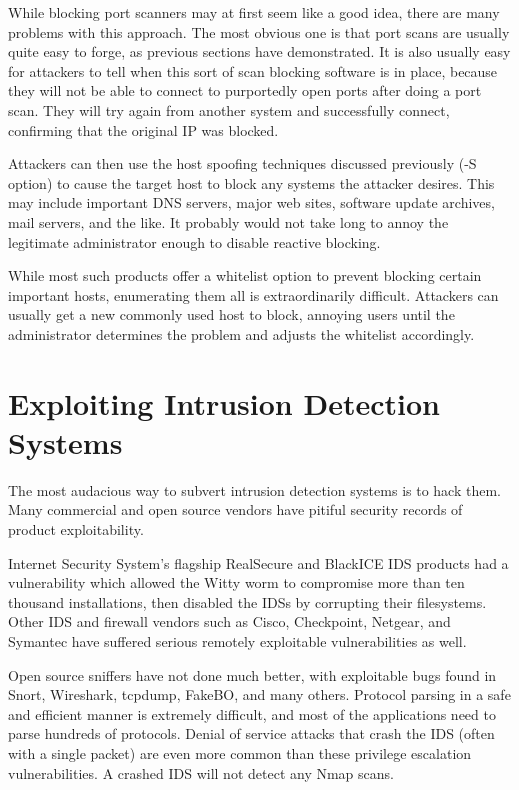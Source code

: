 While blocking port scanners may at first seem like a good idea, there are many problems with this approach. 
The most obvious one is that port scans are usually quite easy to forge, as previous sections have demonstrated. 
It is also usually easy for attackers to tell when this sort of scan blocking software is in place, because they will not 
be able to connect to purportedly open ports after doing a port scan. 
They will try again from another system and successfully connect, confirming that the original IP was blocked.

Attackers can then use the host spoofing techniques discussed previously (-S option) to cause the target host 
to block any systems the attacker desires. 
This may include important DNS servers, major web sites, software update archives, mail servers, and the like. 
It probably would not take long to annoy the legitimate administrator enough to disable reactive blocking.

While most such products offer a whitelist option to prevent blocking certain important hosts, enumerating them 
all is extraordinarily difficult. 
Attackers can usually get a new commonly used host to block, annoying users until the administrator determines 
the problem and adjusts the whitelist accordingly.

\section{Exploiting Intrusion Detection Systems}
The most audacious way to subvert intrusion detection systems is to hack them. 
Many commercial and open source vendors have pitiful security records of product exploitability.

Internet Security System's flagship RealSecure and BlackICE IDS products had a vulnerability which allowed the 
Witty worm to compromise more than ten thousand installations, then disabled the IDSs by corrupting their filesystems. 
Other IDS and firewall vendors such as Cisco, Checkpoint, Netgear, and Symantec have suffered serious remotely 
exploitable vulnerabilities as well.

Open source sniffers have not done much better, with exploitable bugs found in Snort, Wireshark, tcpdump, FakeBO, and many others. 
Protocol parsing in a safe and efficient manner is extremely difficult, and most of the applications need to parse hundreds of protocols. 
Denial of service attacks that crash the IDS (often with a single packet) are even more common 
than these privilege escalation vulnerabilities. 
A crashed IDS will not detect any Nmap scans.

